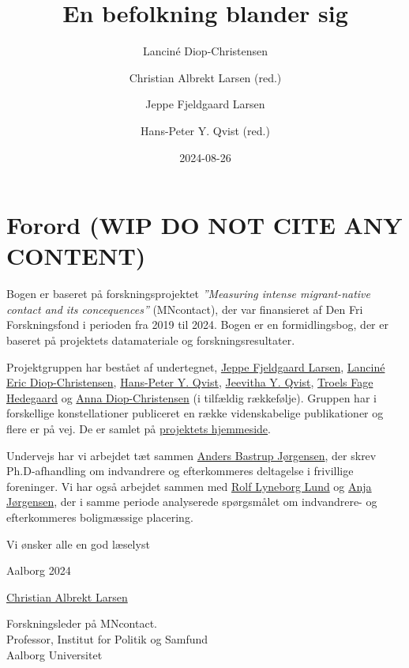 \documentclass[
]{book}
\title{En befolkning blander sig}
\author{Lanciné Diop-Christensen \and Christian Albrekt Larsen (red.) \and Jeppe Fjeldgaard Larsen \and Hans-Peter Y. Qvist (red.)}
\date{2024-08-26}
\begin{document}
\maketitle

{
\setcounter{tocdepth}{1}
\tableofcontents
}
\chapter*{\texorpdfstring{Forord (\textbf{WIP DO NOT CITE ANY CONTENT})}{Forord (WIP DO NOT CITE ANY CONTENT)}}\label{forord-wip-do-not-cite-any-content}

Bogen er baseret på forskningsprojektet \emph{''Measuring intense migrant-native contact and its concequences''} (MNcontact), der var finansieret af Den Fri Forskningsfond i perioden fra 2019 til 2024. Bogen er en formidlingsbog, der er baseret på projektets datamateriale og forskningsresultater.

Projektgruppen har bestået af undertegnet, \href{https://vbn.aau.dk/da/persons/jeppefl}{Jeppe Fjeldgaard Larsen}, \href{https://vbn.aau.dk/en/persons/led}{Lanciné Eric Diop-Christensen}, \href{https://vbn.aau.dk/da/persons/hpq}{Hans-Peter Y. Qvist}, \href{https://vbn.aau.dk/en/persons/jy}{Jeevitha Y. Qvist}, \href{https://vbn.aau.dk/en/persons/troelsfh}{Troels Fage Hedegaard} og \href{https://dk.linkedin.com/in/anna-diop-christensen-58b5ba282}{Anna Diop-Christensen} (i tilfældig rækkefølje). Gruppen har i forskellige konstellationer publiceret en række videnskabelige publikationer og flere er på vej. De er samlet på \href{https://www.politics-society.aau.dk/research/projects/mncontact}{projektets hjemmeside}.

Undervejs har vi arbejdet tæt sammen \href{https://vbn.aau.dk/en/persons/anbajo}{Anders Bastrup Jørgensen}, der skrev Ph.D-afhandling om indvandrere og efterkommeres deltagelse i frivillige foreninger. Vi har også arbejdet sammen med \href{https://vbn.aau.dk/en/persons/rolfll}{Rolf Lyneborg Lund} og \href{https://vbn.aau.dk/en/persons/anjaj}{Anja Jørgensen}, der i samme periode analyserede spørgsmålet om indvandrere- og efterkommeres boligmæssige placering.

Vi ønsker alle en god læselyst

Aalborg 2024

\href{https://vbn.aau.dk/en/persons/albrekt}{Christian Albrekt Larsen}

Forskningsleder på MNcontact.\\
Professor, Institut for Politik og Samfund\\
Aalborg Universitet\\
\end{document}
